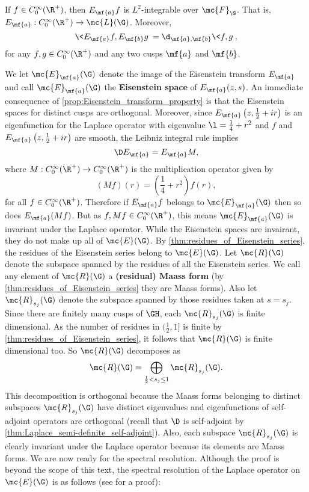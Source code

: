     \begin{proposition}\label{prop:Eisenstein_transform_property}
      If $f \in C_{0}^{\infty}(\R^{+})$, then $E_{\mf{a}}f$ is $L^{2}$-integrable over $\mc{F}_{\G}$. That is, $E_{\mf{a}}:C_{0}^{\infty}(\R^{+}) \to \mc{L}(\G)$. Moreover,
      \[
        \<E_{\mf{a}}f,E_{\mf{b}}g\> = \d_{\mf{a},\mf{b}}\<f,g\>,
      \]
      for any $f,g \in C_{0}^{\infty}(\R^{+})$ and any two cusps $\mf{a}$ and $\mf{b}$.
    \end{proposition}

    We let $\mc{E}_{\mf{a}}(\G)$ denote the image of the Eisenstein transform $E_{\mf{a}}$ and call $\mc{E}_{\mf{a}}(\G)$ the \textbf{Eisenstein space} of $E_{\mf{a}}(z,s)$. An immediate consequence of \cref{prop:Eisenstein_transform_property} is that the Eisenstein spaces for distinct cusps are orthogonal. Moreover, since $E_{\mf{a}}\left(z,\frac{1}{2}+ir\right)$ is an eigenfunction for the Laplace operator with eigenvalue $\l = \frac{1}{4}+r^{2}$ and $f$ and $E_{\mf{a}}\left(z,\frac{1}{2}+ir\right)$ are smooth, the Leibniz integral rule implies
    \[
      \D E_{\mf{a}}= E_{\mf{a}}M,
    \]
    where $M:C_{0}^{\infty}(\R^{+}) \to C_{0}^{\infty}(\R^{+})$ is the multiplication operator given by
    \[
      (Mf)(r) = \left(\frac{1}{4}+r^{2}\right)f(r),
    \]
    for all $f \in C_{0}^{\infty}(\R^{+})$. Therefore if $E_{\mf{a}}f$ belongs to $\mc{E}_{\mf{a}}(\G)$ then so does $E_{\mf{a}}(Mf)$. But as $f,Mf \in C_{0}^{\infty}(\R^{+})$, this means $\mc{E}_{\mf{a}}(\G)$ is invariant under the Laplace operator. While the Eisenstein spaces are invairant, they do not make up all of $\mc{E}(\G)$. By \cref{thm:residues_of_Eisenstein_series}, the residues of the Eisenstein series belong to $\mc{E}(\G)$. Let $\mc{R}(\G)$ denote the subspace spanned by the residues of all the Eisenstein series. We call any element of $\mc{R}(\G)$ a \textbf{(residual) Maass form} (by \cref{thm:residues_of_Eisenstein_series} they are Maass forms). Also let $\mc{R}_{s_{j}}(\G)$ denote the subspace spanned by those residues taken at $s = s_{j}$. Since there are finitely many cusps of $\GH$, each $\mc{R}_{s_{j}}(\G)$ is finite dimensional. As the number of residues in $(\frac{1}{2},1]$ is finite by \cref{thm:residues_of_Eisenstein_series}, it follows that $\mc{R}(\G)$ is finite dimensional too. So $\mc{R}(\G)$ decomposes as
    \[
      \mc{R}(\G) = \bigoplus_{\frac{1}{2} < s_{j} \le 1}\mc{R}_{s_{j}}(\G).
    \]
    This decomposition is orthogonal because the Maass forms belonging to distinct subspaces $\mc{R}_{s_{j}}(\G)$ have distinct eigenvalues and eigenfunctions of self-adjoint operators are orthogonal (recall that $\D$ is self-adjoint by \cref{thm:Laplace_semi-definite_self-adjoint}). Also, each subspace $\mc{R}_{s_{j}}(\G)$ is clearly invariant under the Laplace operator because its elements are Maass forms.
    We are now ready for the spectral resolution. Although the proof is beyond the scope of this text, the spectral resolution of the Laplace operator on $\mc{E}(\G)$ is as follows (see \cite{iwaniec2002spectral} for a proof):

